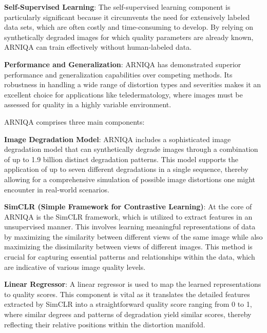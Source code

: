 \textbf{Self-Supervised Learning}: The self-supervised learning component is particularly significant because it circumvents the need for extensively labeled data sets, which are often costly and time-consuming to develop. By relying on synthetically degraded images for which quality parameters are already known, ARNIQA can train effectively without human-labeled data. \par
\vspace{\baselineskip}
\noindent
\textbf{Performance and Generalization}: ARNIQA has demonstrated superior performance and generalization capabilities over competing methods. Its robustness in handling a wide range of distortion types and severities makes it an excellent choice for applications like teledermatology, where images must be assessed for quality in a highly variable environment. \par
\vspace{\baselineskip}
\noindent
ARNIQA comprises three main components: 
\par
\vspace{\baselineskip}
\noindent
\textbf{Image Degradation Model}: ARNIQA includes a sophisticated image degradation model that can synthetically degrade images through a combination of up to 1.9 billion distinct degradation patterns. This model supports the application of up to seven different degradations in a single sequence, thereby allowing for a comprehensive simulation of possible image distortions one might encounter in real-world scenarios. \par
\vspace{\baselineskip}
\noindent
\textbf{SimCLR (Simple Framework for Contrastive Learning)}: At the core of ARNIQA is the SimCLR framework, which is utilized to extract features in an unsupervised manner. This involves learning meaningful representations of data by maximizing the similarity between different views of the same image while also maximizing the dissimilarity between views of different images. This method is crucial for capturing essential patterns and relationships within the data, which are indicative of various image quality levels. \par
\vspace{\baselineskip}
\noindent
\textbf{Linear Regressor}: A linear regressor is used to map the learned representations to quality scores. This component is vital as it translates the detailed features extracted by SimCLR into a straightforward quality score ranging from 0 to 1, where similar degrees and patterns of degradation yield similar scores, thereby reflecting their relative positions within the distortion manifold. \par

